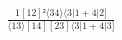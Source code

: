 \documentclass[varwidth, border=5pt]{standalone}
\begin{document}
\begin{my}
$\begin{gathered}
\scriptscriptstyle\frac{1[12]²⟨34⟩⟨3|1+4|2]}{⟨13⟩[14][23]⟨3|1+4|3]}
\end{gathered}$
\end{my}
\end{document}
